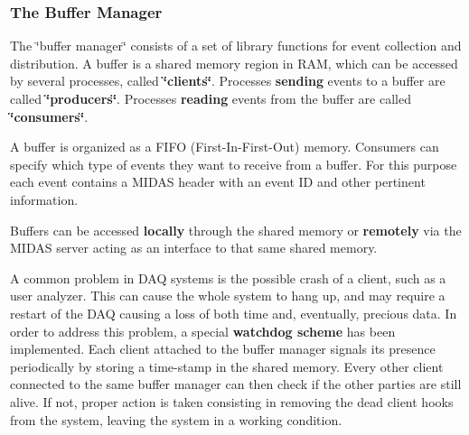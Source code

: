 \label{F_MainElements_idx_buffer_manager}
\hypertarget{F_MainElements_idx_buffer_manager}{}
 \label{F_MainElements_idx_shared_memory}
\hypertarget{F_MainElements_idx_shared_memory}{}
 \hypertarget{F_MainElements_F_Buffer_Manager_overview}{}\subsubsection{The Buffer Manager}\label{F_MainElements_F_Buffer_Manager_overview}
The \char`\"{}buffer manager\char`\"{} consists of a set of library functions for event collection and distribution. A buffer is a shared memory region in RAM, which can be accessed by several processes, called {\bfseries \char`\"{}clients\char`\"{}}. Processes {\bfseries sending} events to a buffer are called {\bfseries \char`\"{}producers\char`\"{}}. Processes {\bfseries reading} events from the buffer are called {\bfseries \char`\"{}consumers\char`\"{}}.

A buffer is organized as a FIFO (First-\/In-\/First-\/Out) memory. Consumers can specify which type of events they want to receive from a buffer. For this purpose each event contains a MIDAS header with an event ID and other pertinent information.

Buffers can be accessed {\bfseries locally} through the shared memory or {\bfseries remotely} via the MIDAS server acting as an interface to that same shared memory.

\label{F_MainElements_idx_watchdog}
\hypertarget{F_MainElements_idx_watchdog}{}
 A common problem in DAQ systems is the possible crash of a client, such as a user analyzer. This can cause the whole system to hang up, and may require a restart of the DAQ causing a loss of both time and, eventually, precious data. In order to address this problem, a special {\bfseries  watchdog scheme } has been implemented. Each client attached to the buffer manager signals its presence periodically by storing a time-\/stamp in the shared memory. Every other client connected to the same buffer manager can then check if the other parties are still alive. If not, proper action is taken consisting in removing the dead client hooks from the system, leaving the system in a working condition.


